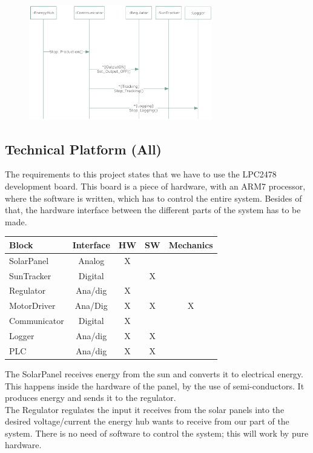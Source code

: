 \documentclass[12pt,a4paper]{report}
\begin{document}
\begin{figure}[htbp]
\centering
\includegraphics[width=8cm]{images/SequenceDiagram}
\caption{}
\label{fig:SequenceDiagram}
\end{figure}



\subsection{Technical Platform (All)}
The requirements to this project states that we have to use the LPC2478 development board. This board is a piece of hardware, with an ARM7 processor, where the software is written, which has to control the entire system. Besides of that, the hardware interface between the different parts of the system has to be made.


\begin{tabular}{|l|c|c|c|c|}
\hline \textbf{Block} & \textbf{Interface} & \textbf{HW} & \textbf{SW} & \textbf{Mechanics} \\ 
\hline SolarPanel & Analog & X &  &  \\ 
\hline SunTracker & Digital &  & X &  \\ 
\hline Regulator & Ana/dig & X &  &  \\ 
\hline MotorDriver & Ana/Dig & X & X & X \\ 
\hline Communicator & Digital & X &  &  \\ 
\hline Logger & Ana/dig & X & X &  \\ 
\hline PLC & Ana/dig & X & X &  \\ 
\hline 
\end{tabular}


The SolarPanel receives energy from the sun and converts it to electrical energy. This happens inside the hardware of the panel, by the use of semi-conductors. It produces energy and sends it to the regulator.\\

The Regulator regulates the input it receives from the solar panels into the desired voltage/current the energy hub wants to receive from our part of the system. There is no need of software to control the system; this will work by pure hardware.\\
\end{document}
